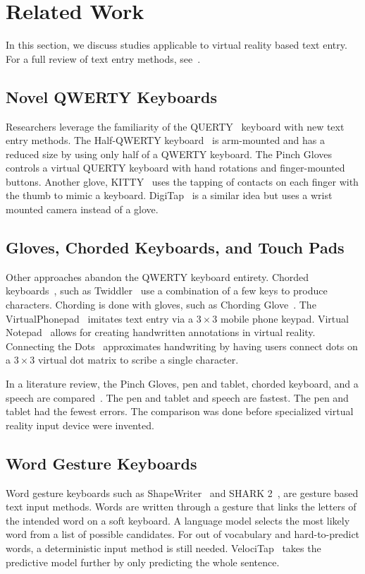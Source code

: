 \section{Related Work}

In this section, we discuss studies applicable to virtual reality based text entry.
For a full review of text entry methods, see~\cite{mackenzie2002text, zhai2005search, Buxton2011}.

\subsection{Novel QWERTY Keyboards}
Researchers leverage the familiarity of the QUERTY~\cite{noyes1983qwerty} keyboard with new text entry methods.
The Half-QWERTY keyboard~\cite{matias1993half} is arm-mounted and has a reduced size by using only half of a QWERTY keyboard.
The Pinch Gloves~\cite{bowman2002text} controls a virtual QUERTY keyboard with hand rotations and finger-mounted buttons.
Another glove, KITTY~\cite{Kuester:2005:TKI:1101616.1101635} uses the tapping of contacts on each finger with the thumb to mimic a keyboard.
DigiTap~\cite{Pratorius:2014:DEV:2671015.2671029} is a similar idea but uses a wrist mounted camera instead of a glove.

\subsection{Gloves, Chorded  Keyboards, and Touch Pads}
Other approaches abandon the QWERTY keyboard entirety.
Chorded keyboards~\cite{noyes1983chord}, such as Twiddler~\cite{lyons2004twiddler} use a combination of a few keys to produce characters.
Chording is done with gloves, such as Chording Glove~\cite{rosenberg1999chording}.
The VirtualPhonepad~\cite{ahn2006virtualphonepad} imitates text entry via a $3\times3$ mobile phone keypad.
Virtual Notepad~\cite{poupyrev1998virtual} allows for creating handwritten annotations in virtual reality.
Connecting the Dots~\cite{frees2006connecting} approximates handwriting by having users connect dots on a $3\times3$ virtual dot matrix to scribe a single character.

In a literature review, the Pinch Gloves, pen and tablet, chorded keyboard, and a speech are compared~\cite{bowman2002text}.
The pen and tablet and speech are fastest.  The pen and tablet had the fewest errors.
The comparison was done before specialized virtual reality input device were invented.

\subsection{Word Gesture Keyboards}
Word gesture keyboards such as ShapeWriter~\cite{zhai2012word,Zhai:2009:SIL:1520340.1520380} and SHARK 2~\cite{kristensson2004shark}, are gesture based text input methods.
Words are written through a gesture that links the letters of the intended word on a soft keyboard.
A language model selects the most likely word from a list of possible candidates.
For out of vocabulary and hard-to-predict words, a deterministic input method is still needed.
VelociTap~\cite{vertanen2015velocitap} takes the predictive model further by only predicting the whole sentence.

